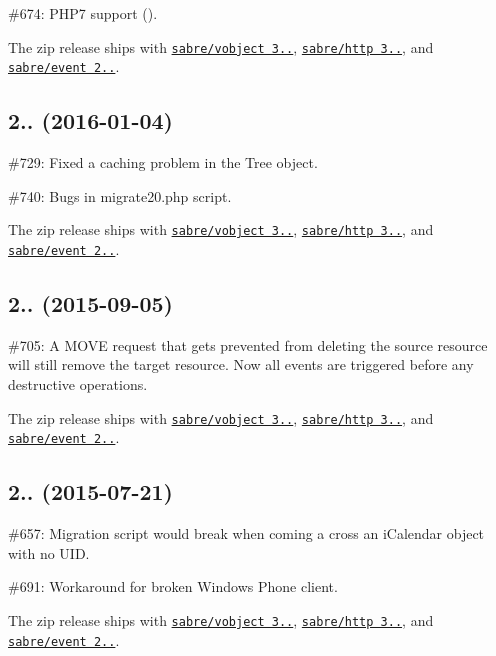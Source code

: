 \begin{DoxyItemize}
\item \#674\+: P\+H\+P7 support ().
\item The zip release ships with \href{http://sabre.io/vobject/}{\tt sabre/vobject 3..}, \href{http://sabre.io/http/}{\tt sabre/http 3..}, and \href{http://sabre.io/event/}{\tt sabre/event 2..}.
\end{DoxyItemize}

\subsection*{2.. (2016-\/01-\/04) }


\begin{DoxyItemize}
\item \#729\+: Fixed a caching problem in the Tree object.
\item \#740\+: Bugs in {\ttfamily migrate20.\+php} script.
\item The zip release ships with \href{http://sabre.io/vobject/}{\tt sabre/vobject 3..}, \href{http://sabre.io/http/}{\tt sabre/http 3..}, and \href{http://sabre.io/event/}{\tt sabre/event 2..}.
\end{DoxyItemize}

\subsection*{2.. (2015-\/09-\/05) }


\begin{DoxyItemize}
\item \#705\+: A {\ttfamily M\+O\+VE} request that gets prevented from deleting the source resource will still remove the target resource. Now all events are triggered before any destructive operations.
\item The zip release ships with \href{http://sabre.io/vobject/}{\tt sabre/vobject 3..}, \href{http://sabre.io/http/}{\tt sabre/http 3..}, and \href{http://sabre.io/event/}{\tt sabre/event 2..}.
\end{DoxyItemize}

\subsection*{2.. (2015-\/07-\/21) }


\begin{DoxyItemize}
\item \#657\+: Migration script would break when coming a cross an i\+Calendar object with no U\+ID.
\item \#691\+: Workaround for broken Windows Phone client.
\item The zip release ships with \href{http://sabre.io/vobject/}{\tt sabre/vobject 3..}, \href{http://sabre.io/http/}{\tt sabre/http 3..}, and \href{http://sabre.io/event/}{\tt sabre/event 2..}.
\end{DoxyItemize}

